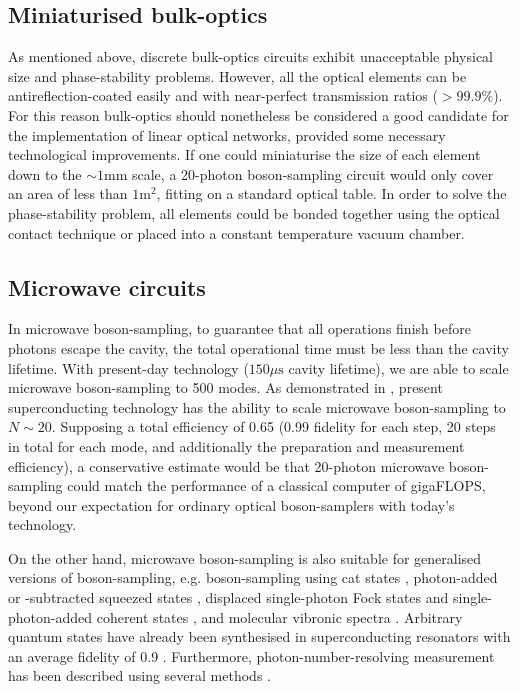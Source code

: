 \documentclass[aps,rmp,twocolumn,amsmath,amssymb,nofootinbib,superscriptaddress]{revtex4}
\begin{document}
\subsection{Miniaturised bulk-optics}

As mentioned above, discrete bulk-optics circuits exhibit unacceptable physical size and phase-stability problems. However, all the optical elements can be antireflection-coated easily and with near-perfect transmission ratios ($>99.9\%$). For this reason bulk-optics should nonetheless be considered a good candidate for the implementation of linear optical networks, provided some necessary technological improvements. If one could miniaturise the size of each element down to the $\sim 1$mm scale, a 20-photon boson-sampling circuit would only cover an area of less than $1\mathrm{m}^2$, fitting on a standard optical table. In order to solve the phase-stability problem, all elements could be bonded together using the optical contact technique or placed into a constant temperature vacuum chamber.

\subsection{Microwave circuits}

In microwave boson-sampling, to guarantee that all operations finish before photons escape the cavity, the total operational time must be less than the cavity lifetime. With present-day technology ($150\mu\mathrm{s}$ cavity lifetime), we are able to scale microwave boson-sampling to 500 modes. As demonstrated in \cite{bib:20}, present superconducting technology has the ability to scale microwave boson-sampling to $N\sim 20$. Supposing a total efficiency of 0.65 (0.99 fidelity for each step, 20 steps in total for each mode, and additionally the preparation and measurement efficiency), a conservative estimate would be that 20-photon microwave boson-sampling could match the performance of a classical computer of gigaFLOPS, beyond our expectation for ordinary optical boson-samplers with today's technology. 

On the other hand, microwave boson-sampling is also suitable for generalised versions of boson-sampling, e.g. boson-sampling using cat states \cite{bib:79}, photon-added or -subtracted squeezed states \cite{bib:80}, displaced single-photon Fock states and single-photon-added coherent states \cite{bib:81}, and molecular vibronic spectra \cite{bib:82}. Arbitrary quantum states have already been synthesised in superconducting resonators with an average fidelity of 0.9 \cite{bib:83}. Furthermore, photon-number-resolving measurement has been described using several methods \cite{bib:84, bib:85}.
\end{document}
